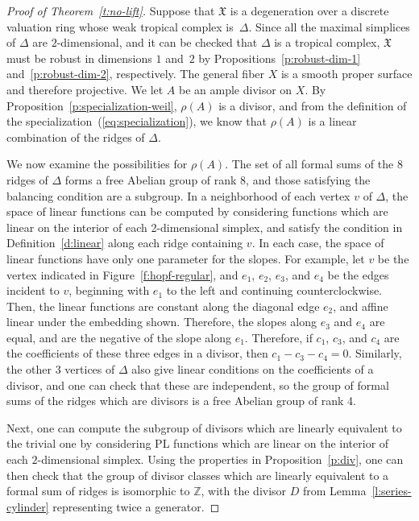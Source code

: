 \documentclass[11pt]{amsart}
\theoremstyle{definition}
\newcommand{\X}{\mathfrak X}
\newcommand{\ZZ}{\mathbb Z}
\begin{document}
\begin{proof}[Proof of Theorem~\ref{t:no-lift}]
Suppose that $\X$ is a degeneration over a discrete valuation ring whose weak
tropical complex is~$\Delta$. Since all the maximal simplices of $\Delta$ are
$2$-dimensional, and it can be checked that $\Delta$ is a tropical complex, $\X$
must be robust in dimensions $1$ and~$2$ by Propositions~\ref{p:robust-dim-1}
and~\ref{p:robust-dim-2}, respectively. The general fiber $X$ is a smooth proper
surface and therefore projective. We let $A$ be an ample divisor on $X$. By
Proposition~\ref{p:specialization-weil}, $\rho(A)$ is a divisor, and from the
definition of the specialization~(\ref{eq:specialization}), we know that
$\rho(A)$ is a linear combination of the ridges of $\Delta$.

We now examine the possibilities for $\rho(A)$.
The set of all formal sums of the 8 ridges of $\Delta$ forms a free Abelian
group of rank 8, and those satisfying the
balancing condition are a subgroup. In a neighborhood of each vertex $v$ of
$\Delta$, the space of linear functions can be computed by considering functions
which are linear on the interior of each 2-dimensional simplex, and satisfy the
condition in Definition~\ref{d:linear} along each ridge containing $v$. In each
case,
the space of linear functions have only one parameter for the slopes.
For example, let $v$ be the vertex indicated in Figure~\ref{f:hopf-regular}, and
$e_1$, $e_2$, $e_3$, and $e_4$ be the edges incident to $v$, beginning with
$e_1$ to the left and continuing counterclockwise. Then, the linear functions
are constant along the diagonal edge $e_2$, and affine linear under the
embedding shown.
Therefore, the slopes along $e_3$ and $e_4$ are equal, and are
the negative of the slope along $e_1$. Therefore, if $c_1$, $c_3$, and $c_4$ are
the coefficients of these three edges in a divisor, then $c_1 - c_3 -c_4 = 0$.
Similarly,
the other 3 vertices of $\Delta$ also give linear conditions on the coefficients
of a divisor, and one can check that these are independent, so the group of
formal sums of the ridges which are divisors is a free Abelian group of rank 4.

Next, one can compute the subgroup of divisors which are linearly equivalent to the
trivial one by considering PL functions which are linear on the interior of each
$2$-dimensional simplex. Using the properties in Proposition~\ref{p:div}, one
can then check that the group of divisor classes which are linearly equivalent
to a formal sum of ridges is isomorphic to $\ZZ$, with the divisor $D$ from
Lemma~\ref{l:series-cylinder} representing twice a generator.


\end{proof}
\end{document}

